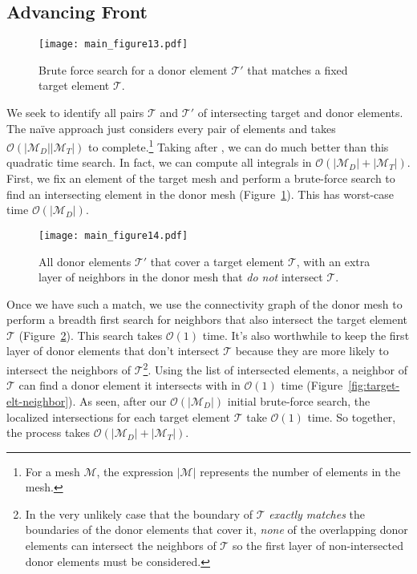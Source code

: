 \documentclass[letterpaper,10pt]{article}
\theoremstyle{definition}
\newcommand{\bigO}[1]{\mathcal{O}\left(#1\right)}
\begin{document}
\subsection{Advancing Front}\label{subsec:advancing-front}

\begin{figure}
  \texttt{[image: main\_figure13.pdf]}
  \centering
  \captionsetup{width=.75\linewidth}
  \caption{Brute force search for a donor element \(\mathcal{T}'\) that matches
    a fixed target element \(\mathcal{T}\).}
  \label{fig:target-elt-brute-force}
\end{figure}

We seek to identify all pairs \(\mathcal{T}\) and \(\mathcal{T}'\) of
intersecting target and donor elements. The na\"{i}ve approach just
considers every pair
of elements and takes \(\bigO{\left|\mathcal{M}_D\right|
\left|\mathcal{M}_T\right|}\) to complete.\footnote{For a mesh \(\mathcal{M}\),
the expression \(\left|\mathcal{M}\right|\) represents the number of elements
in the mesh.} Taking after \cite{Farrell2011}, we can do much better than this
quadratic time search. In fact, we can compute all integrals in
\(\bigO{\left|\mathcal{M}_D\right| + \left|\mathcal{M}_T\right|}\).
First, we fix an element of the target mesh and perform a brute-force search
to find an intersecting element in the donor mesh
(Figure~\ref{fig:target-elt-brute-force}). This has worst-case time
\(\bigO{\left|\mathcal{M}_D\right|}\).

\begin{figure}
  \texttt{[image: main\_figure14.pdf]}
  \centering
  \captionsetup{width=.75\linewidth}
  \caption{All donor elements \(\mathcal{T}'\) that cover a target element
    \(\mathcal{T}\), with an extra layer of neighbors in the donor mesh
    that \emph{do not} intersect \(\mathcal{T}\).}
  \label{fig:target-elt-overlap-extra-layer}
\end{figure}

Once we have such a match, we use the connectivity graph of the
donor mesh to perform a breadth first search
for neighbors that also intersect the target
element \(\mathcal{T}\) (Figure~\ref{fig:target-elt-overlap-extra-layer}).
This search takes \(\bigO{1}\) time. It's also worthwhile to keep the first
layer of donor elements that don't intersect \(\mathcal{T}\) because they are
more likely to intersect the neighbors of \(\mathcal{T}\)\footnote{In the
very unlikely case that the boundary of \(\mathcal{T}\)
\emph{exactly matches} the boundaries of the donor elements that cover it,
\emph{none} of the overlapping donor elements can intersect the neighbors of
\(\mathcal{T}\) so the first layer of non-intersected donor
elements must be considered.}. Using the list of intersected elements, a
neighbor of \(\mathcal{T}\) can find a donor element it intersects with in
\(\bigO{1}\) time (Figure~\ref{fig:target-elt-neighbor}).
As seen, after our \(\bigO{\left|\mathcal{M}_D\right|}\)
initial brute-force search, the localized intersections for each
target element \(\mathcal{T}\) take
\(\bigO{1}\) time. So together, the process takes
\(\bigO{\left|\mathcal{M}_D\right| + \left|\mathcal{M}_T\right|}\).
\end{document}
